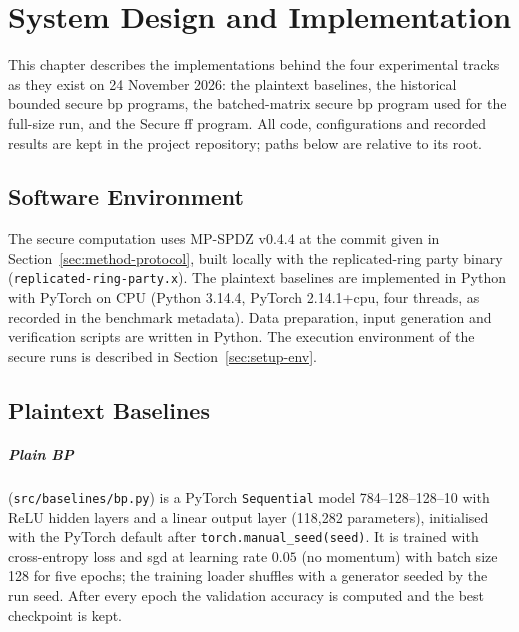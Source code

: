 \chapter{System Design and Implementation}\label{chap:impl}
\sloppy

This chapter describes the implementations behind the four experimental tracks as they exist on 24 November 2026: the plaintext baselines, the historical bounded secure \ac{bp} programs, the batched-matrix secure \ac{bp} program used for the full-size run, and the Secure \ac{ff} program. All code, configurations and recorded results are kept in the project repository; paths below are relative to its root.

\section{Software Environment}\label{sec:impl-env}
The secure computation uses MP-SPDZ v0.4.4 at the commit given in Section~\ref{sec:method-protocol}, built locally with the replicated-ring party binary (\texttt{replicated-ring-party.x}). The plaintext baselines are implemented in Python with PyTorch on CPU (Python 3.14.4, PyTorch 2.14.1+cpu, four threads, as recorded in the benchmark metadata). Data preparation, input generation and verification scripts are written in Python. The execution environment of the secure runs is described in Section~\ref{sec:setup-env}.

\section{Plaintext Baselines}\label{sec:impl-plain}
\paragraph{Plain BP} (\texttt{src/\allowbreak baselines/\allowbreak bp.py}) is a PyTorch \texttt{Sequential} model 784--128--128--10 with ReLU hidden layers and a linear output layer (118{,}282 parameters), initialised with the PyTorch default after \texttt{torch.manual\_seed(seed)}. It is trained with cross-entropy loss and \ac{sgd} at learning rate $0.05$ (no momentum) with batch size 128 for five epochs; the training loader shuffles with a generator seeded by the run seed. After every epoch the validation accuracy is computed and the best checkpoint is kept.

